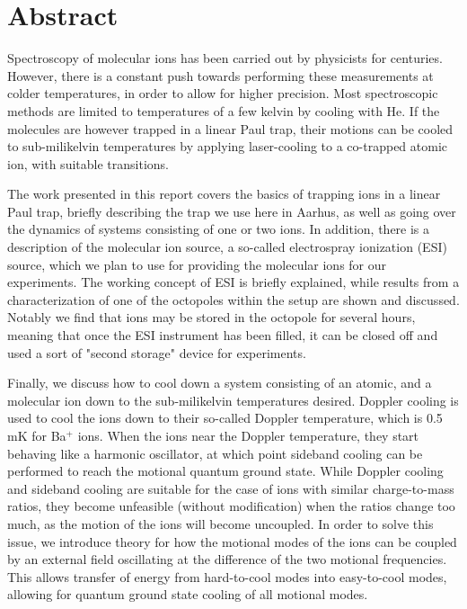 
\setcounter{page}{2}

\vspace*{0.5cm}
\section*{Abstract}
\thispagestyle{empty}

Spectroscopy of molecular ions has been carried out by physicists for centuries. However, there is a constant push towards performing these measurements at colder temperatures, in order to allow for higher precision.
Most spectroscopic methods are limited to temperatures of a few kelvin by cooling with He. If the molecules are however trapped in a linear Paul trap, their motions can be cooled to sub-milikelvin temperatures by applying laser-cooling to a co-trapped atomic ion, with suitable transitions.

The work presented in this report covers the basics of trapping ions in a linear Paul trap, briefly describing the trap we use here in Aarhus, as well as going over the dynamics of systems consisting of one or two ions.
In addition, there is a description of the molecular ion source, a so-called electrospray ionization (ESI) source, which we plan to use for providing the molecular ions for our experiments.
The working concept of ESI is briefly explained, while results from a characterization of one of the octopoles within the setup are shown and discussed. Notably we find that ions may be stored in the octopole for several hours, meaning that once the ESI instrument has been filled, it can be closed off and used a sort of "second storage" device for experiments.

Finally, we discuss how to cool down a system consisting of an atomic, and a molecular ion down to the sub-milikelvin temperatures desired. Doppler cooling is used to cool the ions down to their so-called Doppler temperature, which is 0.5 mK for Ba$^+$ ions. When the ions near the Doppler temperature, they start behaving like a harmonic oscillator, at which point sideband cooling can be performed to reach the motional quantum ground state.
While Doppler cooling and sideband cooling are suitable for the case of ions with similar charge-to-mass ratios, they become unfeasible (without modification) when the ratios change too much, as the motion of the ions will become uncoupled.
In order to solve this issue, we introduce theory for how the motional modes of the ions can be coupled by an external field oscillating at the difference of the two motional frequencies. This allows transfer of energy from hard-to-cool modes into easy-to-cool modes, allowing for quantum ground state cooling of all motional modes.

